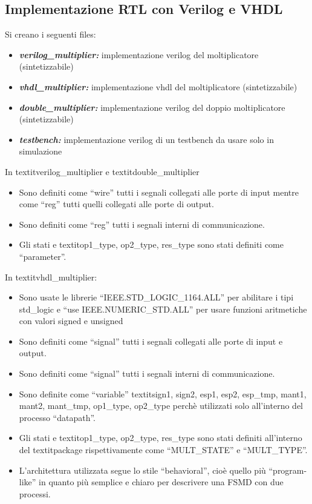 \documentclass[]{IEEEtran}
\begin{document}
\subsection{Implementazione RTL con Verilog e VHDL}
Si creano i seguenti files:
\begin{itemize}
    \item {\it\bf verilog\_multiplier:} implementazione verilog del moltiplicatore (sintetizzabile)
    \item {\it\bf vhdl\_multiplier:} implementazione vhdl del moltiplicatore (sintetizzabile)
    \item {\it\bf double\_multiplier:} implementazione verilog del doppio moltiplicatore (sintetizzabile)
    \item {\it\bf testbench:} implementazione verilog di un testbench da usare solo in simulazione
\end{itemize}
In textit{verilog\_multiplier} e textit{double\_multiplier}
\begin{itemize}
    \item Sono definiti come ``wire'' tutti i segnali collegati alle porte di input mentre come ``reg'' tutti quelli collegati alle porte di output.
    \item Sono definiti come ``reg'' tutti i segnali interni di communicazione.
    \item Gli stati e textit{op1\_type, op2\_type, res\_type} sono stati definiti come ``parameter''.
\end{itemize}
In textit{vhdl\_multiplier:}
\begin{itemize}
    \item Sono usate le librerie ``IEEE.STD\_LOGIC\_1164.ALL'' per abilitare i tipi std\_logic e ``use IEEE.NUMERIC\_STD.ALL'' per usare funzioni aritmetiche con valori signed e unsigned
    \item Sono definiti come ``signal'' tutti i segnali collegati alle porte di input e output.
    \item Sono definiti come ``signal'' tutti i segnali interni di communicazione.
    \item Sono definite come ``variable'' textit{sign1, sign2, esp1, esp2, esp\_tmp, mant1, mant2, mant\_tmp, op1\_type, op2\_type} perchè utilizzati solo all'interno del processo ``datapath''.
    \item Gli stati e textit{op1\_type, op2\_type, res\_type} sono stati definiti all'interno del textit{package} rispettivamente come ``MULT\_STATE'' e ``MULT\_TYPE''.
    \item L'architettura utilizzata segue lo stile ``behavioral'', cioè quello più ``program-like'' in quanto più semplice e chiaro per descrivere una FSMD con due processi.
\end{itemize}
\end{document}
